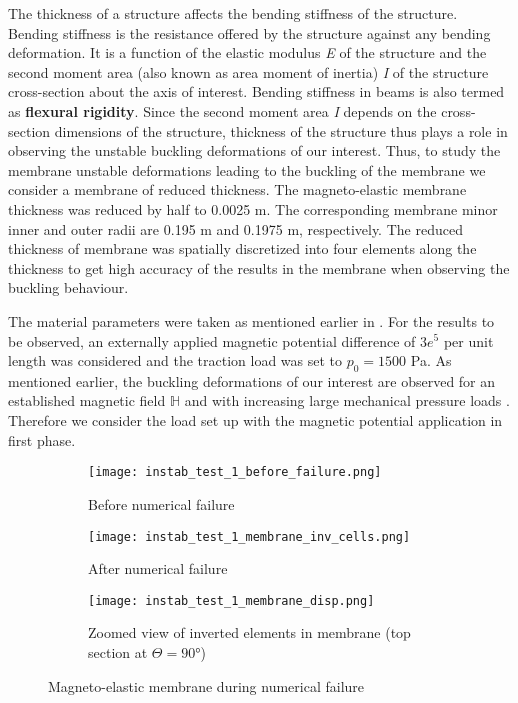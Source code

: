 The thickness of a structure affects the bending stiffness of the structure. Bending stiffness is the resistance offered by the structure against any bending deformation. It is a function of the elastic modulus \textit{E} of the structure and the second moment area (also known as area moment of inertia) \textit{I} of the structure cross-section about the axis of interest. Bending stiffness in beams is also termed as \textbf{flexural rigidity}. Since the second moment area \textit{I} depends on the cross-section dimensions of the structure, thickness of the structure thus plays a role in observing the unstable buckling deformations of our interest. Thus, to study the membrane unstable deformations leading to the buckling of the membrane we consider a membrane of reduced thickness. The magneto-elastic membrane thickness was reduced by half to 0.0025 m. The corresponding membrane minor inner and outer radii are 0.195 m and 0.1975 m, respectively. The reduced thickness of membrane was spatially discretized into four elements along the thickness to get high accuracy of the results in the membrane when observing the buckling behaviour.  \par 

The material parameters were taken as mentioned earlier in . For the results to be observed, an externally applied magnetic potential difference of $3e^5$ per unit length was considered and the traction load was set to $p_0 = 1500$ Pa. As mentioned earlier, the buckling deformations of our interest are observed for an established magnetic field $\mathbb{H}$ and with increasing large mechanical pressure loads \cite{reddy_toroid,Reddy2018}. Therefore we consider the load set up with the magnetic potential application in first phase. \par 


\begin{figure}[h]
\centering
\begin{subfigure}{0.3\textwidth}
\centering
\texttt{[image: instab\_test\_1\_before\_failure.png]}
\caption{Before numerical failure}
\label{fig:3.16.1}
\end{subfigure}
\begin{subfigure}{0.3\textwidth}
\centering
\texttt{[image: instab\_test\_1\_membrane\_inv\_cells.png]}
\caption{After numerical failure}
\label{fig:3.16.2}
\end{subfigure}
\begin{subfigure}{0.38\textwidth}
\centering
\texttt{[image: instab\_test\_1\_membrane\_disp.png]}
\caption{Zoomed view of inverted elements in membrane (top section at $\Theta = \ang{90}$)}
\label{fig:3.16.3}
\end{subfigure}
\caption{Magneto-elastic membrane during numerical failure}
\label{fig:3.16}
\end{figure}

